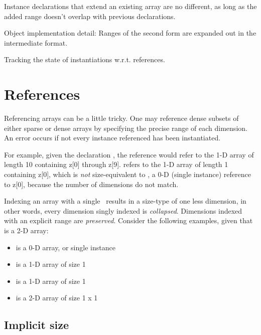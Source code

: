 Instance declarations that extend an existing array are no different, 
as long as the added range doesn't overlap with previous declarations.  

Object implementation detail:
Ranges of the second form are expanded out in the intermediate format.  

Tracking the state of instantiations w.r.t. references.  

\section{References}
\label{sec:arrays:references}

Referencing arrays can be a little tricky.  
One may reference dense subsets of either sparse or dense arrays
by specifying the precise range of each dimension.  
An error occurs if not every instance referenced has been instantiated.  

For example, given the declaration , 
the reference  would refer to the
1-D array of length 10 containing z[0] through z[9].  
 refers to the 1-D array of length 1 containing z[0], 
which is \emph{not} size-equivalent to , 
a 0-D (single instance) reference to z[0], 
because the number of dimensions do not match.  

Indexing an array with a single \pint\ results in a size-type of one less
dimension, in other words, every dimension singly indexed is \emph{collapsed}.  
Dimensions indexed with an explicit range are \emph{preserved}.  
Consider the following examples, given that  is a 2-D array:
\begin{itemize}
\item {} is a 0-D array, or single instance
\item {} is a 1-D array of size 1
\item {} is a 1-D array of size 1
\item {} is a 2-D array of size 1 x 1
\end{itemize}

\subsection{Implicit size}
\label{sec:arrays:references:implicit}

